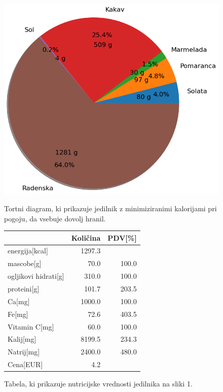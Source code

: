 \documentclass[slovene,11pt,a4paper]{article}
\begin{document}
\begin{figure}[h!]
  \centering
  \begin{minipage}[h]{0.56\textwidth}
    \includegraphics[width=\textwidth]{piechart1.png}
    \caption{Tortni diagram, ki prikazuje jedilnik z minimiziranimi kalorijami pri pogoju, da 				vsebuje dovolj hranil.}
  \end{minipage}
  \hfill
  \begin{minipage}[h]{0.42\textwidth}
	\begin{tabular}{lrr}
	  	\toprule
		{} &  Količina &  PDV[\%] \\
		\midrule
		energija[kcal]       &    1297.3 &         \\
		mascobe[g]           &      70.0 &   100.0 \\
		ogljikovi hidrati[g] &     310.0 &   100.0 \\
		proteini[g]          &     101.7 &   203.5 \\
		Ca[mg]               &    1000.0 &   100.0 \\
		Fe[mg]               &      72.6 &   403.5 \\
		Vitamin C[mg]        &      60.0 &   100.0 \\
		Kalij[mg]            &    8199.5 &   234.3 \\
		Natrij[mg]           &    2400.0 &   480.0 \\
		Cena[EUR]            &       4.2 &         \\
		\bottomrule
	\end{tabular}
	\caption{Tabela, ki prikazuje nutricijske vrednosti jedilnika na sliki 1.}
  \end{minipage}
\end{figure}
\end{document}
